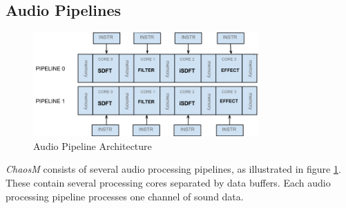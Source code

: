 \FloatBarrier
\subsection{Audio Pipelines}\label{subsec:audio_pipelines}

\begin{figure}[H]
    \centering
    \includegraphics[height=150px]{figures/fpga/system_components_general_pipeline.png}
    \caption{Audio Pipeline Architecture}
    \label{fig:pipeline_architecture}
\end{figure}

\textit{ChaosM} consists of several audio processing pipelines, as illustrated in
figure \ref{fig:pipeline_architecture}. These contain several processing cores
separated by data buffers. Each audio processing pipeline processes one channel
of sound data.

